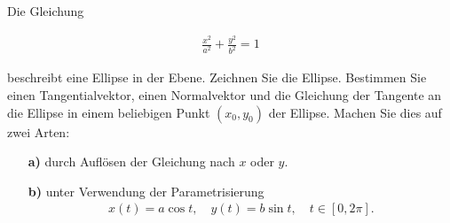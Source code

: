 \begin{exercise}

Die Gleichung

\begin{align*}
  \frac{x^2}{a^2} + \frac{y^2}{b^2} = 1
\end{align*}

beschreibt eine Ellipse in der Ebene. Zeichnen Sie die Ellipse. Bestimmen Sie einen Tangentialvektor, einen Normalvektor und die Gleichung der Tangente an die Ellipse in einem beliebigen Punkt $(x_0, y_0)$ der Ellipse. Machen Sie dies auf zwei Arten:

\begin{itemize}

  \item[\textbf{a)}] durch Auflösen der Gleichung nach $x$ oder $y$.

  \item[\textbf{b)}] unter Verwendung der Parametrisierung
  \begin{align*}
    x(t) = a \cos{t},
    \quad
    y(t) = b \sin{t},
    \quad
    t \in [0, 2 \pi].
  \end{align*}

\end{itemize}

\end{exercise}

